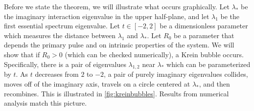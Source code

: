 \documentclass[thesis.tex]{subfiles}
\begin{document}
Before we state the theorem, we will illustrate what occurs graphically. Let $\lambda_*$ be the imaginary interaction eigenvalue in the upper half-plane, and let $\lambda_1$ be the first essential spectrum eigenvalue. Let $t \in [-2, 2]$ be a dimensionless parameter which measures the distance between $\lambda_1$ and $\lambda_*$. Let $R_0$ be a parameter that depends the primary pulse and on intrinsic properties of the system. We will show that if $R_0 > 0$ (which can be checked numerically), a Krein bubble occurs. Specifically, there is a pair of eigenvalues $\lambda_{1,2}$ near $\lambda_*$ which can be parameterized by $t$. As $t$ decreases from $2$ to $-2$, a pair of purely imaginary eigenvalues collides, moves off of the imaginary axis, travels on a circle centered at $\lambda_*$, and then recombines. This is illustrated in \cref{fig:kreinbubbles}. Results from numerical analysis match this picture.
\end{document}

